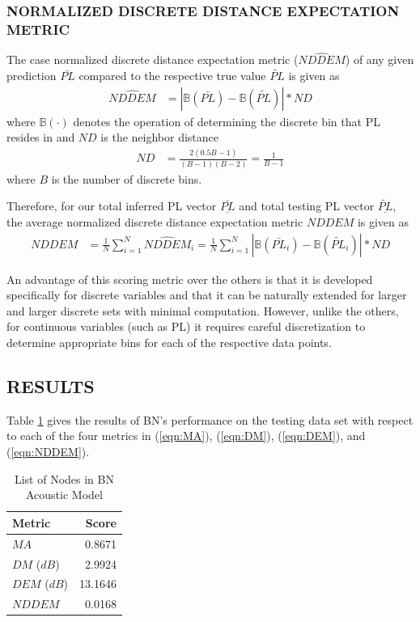 \documentclass[12pt]{article}
\begin{document}
\subsubsection{NORMALIZED DISCRETE DISTANCE EXPECTATION METRIC}
The case normalized discrete distance expectation metric ($\hat{NDDEM}$) of any given prediction $\bar{PL}$ compared to the respective true value $\tilde{PL}$ is given as
\begin{align}
    \hat{NDDEM}&=|\mathbb B(\bar{PL})-\mathbb B(\tilde{PL})|*ND
\end{align}
where $\mathbb B(\cdot)$ denotes the operation of determining the discrete bin that PL resides in and $ND$ is the neighbor distance
\begin{align}
    ND&=\frac{2(0.5B-1)}{(B-1)(B-2)}=\frac{1}{B-1}
\end{align}
where $B$ is the number of discrete bins.

Therefore, for our total inferred PL vector $\underline{\bar{PL}}$ and total testing PL vector $\underline{\tilde{PL}}$, the average normalized discrete distance expectation metric $NDDEM$ is given as
\begin{align}\label{eqn:NDDEM}
    NDDEM&=\frac1N\sum_{i=1}^N\hat{NDDEM}_i=\frac1N\sum_{i=1}^N|\mathbb B(\bar{PL}_i)-\mathbb B(\tilde{PL}_i)|*ND
\end{align}

An advantage of this scoring metric over the others is that it is developed specifically for discrete variables and that it can be naturally extended for larger and larger discrete sets with minimal computation. However, unlike the others, for continuous variables (such as PL) it requires careful discretization to determine appropriate bins for each of the respective data points.

\subsection{RESULTS}
Table \ref{tab:results} gives the results of BN's performance on the testing data set with respect to each of the four metrics in (\ref{eqn:MA}), (\ref{eqn:DM}), (\ref{eqn:DEM}), and (\ref{eqn:NDDEM}).

\begin{table}[htb]
    \centering
    \caption{List of Nodes in BN Acoustic Model}
    \label{tab:results}
    \begin{tabular}{lr}
        \toprule
        \textbf{Metric} & \textbf{Score}\\
        \midrule
        $MA$ & 0.8671\\
        $DM$ ($dB$) & 2.9924\\
        $DEM$ ($dB$) & 13.1646\\
        $NDDEM$ & 0.0168\\
        \bottomrule
    \end{tabular}
\end{table}
\end{document}
